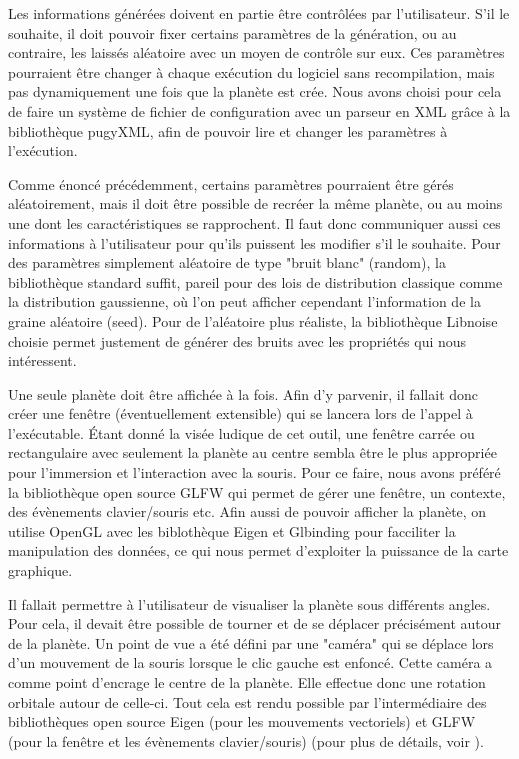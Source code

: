 \documentclass[a4paper]{article}
\begin{document}
\label{besoin_paramètres}
Les informations générées doivent en partie être contrôlées par l'utilisateur. S'il le souhaite, il doit pouvoir fixer certains paramètres de la génération, ou au contraire, les laissés aléatoire avec un moyen de contrôle sur eux. Ces paramètres pourraient être changer à chaque exécution du logiciel sans recompilation, mais pas dynamiquement une fois que la planète est crée. Nous avons choisi pour cela de faire un système de fichier de configuration avec un parseur en XML grâce à la bibliothèque pugyXML, afin de pouvoir lire et changer les paramètres à l'exécution.

\label{besoin_aleatory}
Comme énoncé précédemment, certains paramètres pourraient être gérés aléatoirement, mais il doit être possible de recréer la même planète, ou au moins une dont les caractéristiques se rapprochent.
Il faut donc communiquer aussi ces informations à l'utilisateur pour qu'ils puissent les modifier s'il le souhaite. 
Pour des paramètres simplement aléatoire de type "bruit blanc" (random), la bibliothèque standard suffit, pareil pour des lois de distribution classique comme la distribution gaussienne, où l'on peut afficher cependant l'information de la graine aléatoire (seed). Pour de l'aléatoire plus réaliste, la bibliothèque Libnoise choisie permet justement de générer des bruits avec les propriétés qui nous intéressent.


Une seule planète doit être affichée à la fois. Afin d’y parvenir, il fallait donc créer une fenêtre (éventuellement extensible) qui se lancera lors de l’appel à l’exécutable. Étant donné la visée ludique de cet outil, une fenêtre carrée ou rectangulaire avec seulement la planète au centre sembla être le plus appropriée pour l’immersion et l’interaction avec la souris. Pour ce faire, nous avons préféré la bibliothèque open source GLFW qui permet de gérer une fenêtre, un contexte, des évènements clavier/souris etc.
Afin aussi de pouvoir afficher la planète, on utilise OpenGL avec les biblothèque Eigen et Glbinding pour facciliter la manipulation des données, ce qui nous permet d'exploiter la puissance de la carte graphique.


Il fallait permettre à l’utilisateur de visualiser la planète sous différents angles. Pour cela, il devait être possible de tourner et de se déplacer précisément autour de la planète. Un point de vue a été défini par une "caméra" qui se déplace lors d’un mouvement de la souris lorsque le clic gauche est enfoncé. Cette caméra a comme point d’encrage le centre de la planète. Elle effectue donc une rotation orbitale autour de celle-ci. Tout cela est rendu possible par l’intermédiaire des bibliothèques open source Eigen (pour les mouvements vectoriels) et GLFW (pour la fenêtre et les évènements clavier/souris) (pour plus de détails, voir \cite{TutoCamera}).
\end{document}

